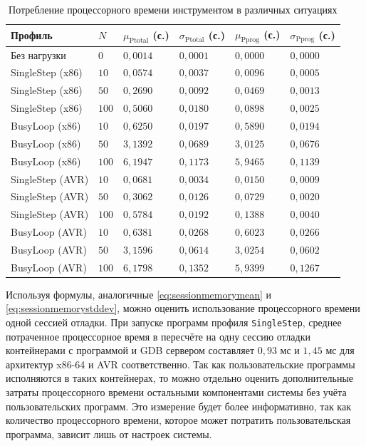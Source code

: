 \documentclass[a4paper,article,14pt]{extarticle}
\begin{document}
\begin{table}[ht]
\small
    \begin{tabular}{|p{3cm}|p{1cm}|p{2.5cm}|p{2.5cm}|p{2.5cm}|p{2.5cm}|}
    \hline
    Профиль & $N$ & $\mu_\mathrm{Ptotal}$ (с.) & $\sigma_\mathrm{Ptotal}$ (с.) &
    $\mu_\mathrm{Pprog}$ (с.) & $\sigma_\mathrm{Pprog}$ (с.) \\
    \hline
Без нагрузки & $0$ & $0{,}0014$ & $0{,}0001$ & $0{,}0000$ & $0{,}0000$ \\ \hline
SingleStep (x86) & $10$ & $0{,}0574$ & $0{,}0037$ & $0{,}0096$ & $0{,}0005$ \\ \hline
SingleStep (x86) & $50$ & $0{,}2690$ & $0{,}0092$ & $0{,}0469$ & $0{,}0013$ \\ \hline
SingleStep (x86) & $100$ & $0{,}5060$ & $0{,}0180$ & $0{,}0898$ & $0{,}0025$ \\ \hline
BusyLoop (x86) & $10$ & $0{,}6250$ & $0{,}0197$ & $0{,}5890$ & $0{,}0194$ \\ \hline
BusyLoop (x86) & $50$ & $3{,}1392$ & $0{,}0689$ & $3{,}0125$ & $0{,}0676$ \\ \hline
BusyLoop (x86) & $100$ & $6{,}1947$ & $0{,}1173$ & $5{,}9465$ & $0{,}1139$ \\ \hline
SingleStep (AVR) & $10$ & $0{,}0681$ & $0{,}0034$ & $0{,}0150$ & $0{,}0009$ \\ \hline
SingleStep (AVR) & $50$ & $0{,}3062$ & $0{,}0126$ & $0{,}0729$ & $0{,}0020$ \\ \hline
SingleStep (AVR) & $100$ & $0{,}5784$ & $0{,}0192$ & $0{,}1388$ & $0{,}0040$ \\ \hline
BusyLoop (AVR) & $10$ & $0{,}6381$ & $0{,}0268$ & $0{,}6023$ & $0{,}0266$ \\ \hline
BusyLoop (AVR) & $50$ & $3{,}1596$ & $0{,}0614$ & $3{,}0254$ & $0{,}0602$ \\ \hline
BusyLoop (AVR) & $100$ & $6{,}1798$ & $0{,}1352$ & $5{,}9399$ & $0{,}1267$ \\ \hline
    \end{tabular}
\caption{\label{table:cpumeasurements}Потребление процессорного времени инструментом в различных ситуациях}
\normalsize
\end{table}

Используя формулы, аналогичные \ref{eq:sessionmemorymean} и \ref{eq:sessionmemorystddev}, можно оценить использование процессорного времени одной сессией отладки. При запуске программ профиля \texttt{SingleStep}, среднее потраченное процессорное время в пересчёте на одну сессию отладки контейнерами с программой и GDB сервером составляет $0{,}93$ мс и $1{,}45$ мс для архитектур x86-64 и AVR соответственно. Так как пользовательские программы исполняются в таких контейнерах, то можно отдельно оценить дополнительные затраты процессорного времени остальными компонентами системы без учёта пользовательских программ. Это измерение будет более информативно, так как количество процессорного времени, которое может потратить пользовательская программа, зависит лишь от настроек системы.
\end{document}
